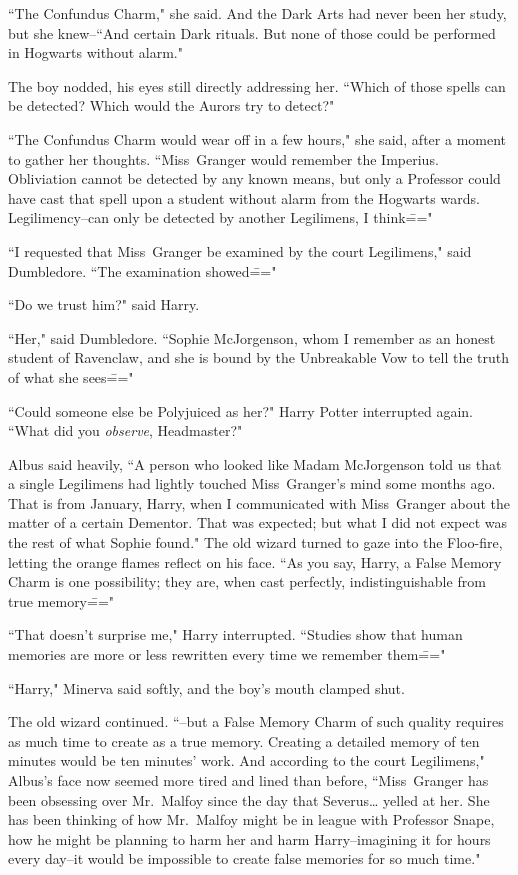 ``The Confundus Charm," she said. And the Dark Arts had never been her study, but she knew\---``And certain Dark rituals. But none of those could be performed in Hogwarts without alarm."

The boy nodded, his eyes still directly addressing her. ``Which of those spells can be detected? Which would the Aurors try to detect?"

``The Confundus Charm would wear off in a few hours," she said, after a moment to gather her thoughts. ``Miss~Granger would remember the Imperius. Obliviation cannot be detected by any known means, but only a Professor could have cast that spell upon a student without alarm from the Hogwarts wards. Legilimency\---can only be detected by another Legilimens, I think\==="

``I requested that Miss~Granger be examined by the court Legilimens," said Dumbledore. ``The examination showed\==="

``Do we trust him?" said Harry.

``Her," said Dumbledore. ``Sophie McJorgenson, whom I remember as an honest student of Ravenclaw, and she is bound by the Unbreakable Vow to tell the truth of what she sees\==="

``Could someone else be Polyjuiced as her?" Harry Potter interrupted again. ``What did you \emph{observe}, Headmaster?"

Albus said heavily, ``A person who looked like Madam McJorgenson told us that a single Legilimens had lightly touched Miss~Granger's mind some months ago. That is from January, Harry, when I communicated with Miss~Granger about the matter of a certain Dementor. That was expected; but what I did not expect was the rest of what Sophie found." The old wizard turned to gaze into the Floo-fire, letting the orange flames reflect on his face. ``As you say, Harry, a False Memory Charm is one possibility; they are, when cast perfectly, indistinguishable from true memory\==="

``That doesn't surprise me," Harry interrupted. ``Studies show that human memories are more or less rewritten every time we remember them\==="

``Harry," Minerva said softly, and the boy's mouth clamped shut.

The old wizard continued. ``\---but a False Memory Charm of such quality requires as much time to create as a true memory. Creating a detailed memory of ten minutes would be ten minutes' work. And according to the court Legilimens," Albus's face now seemed more tired and lined than before, ``Miss~Granger has been obsessing over Mr.~Malfoy since the day that Severus{\ldots} yelled at her. She has been thinking of how Mr.~Malfoy might be in league with Professor Snape, how he might be planning to harm her and harm Harry\---imagining it for hours every day\---it would be impossible to create false memories for so much time."

